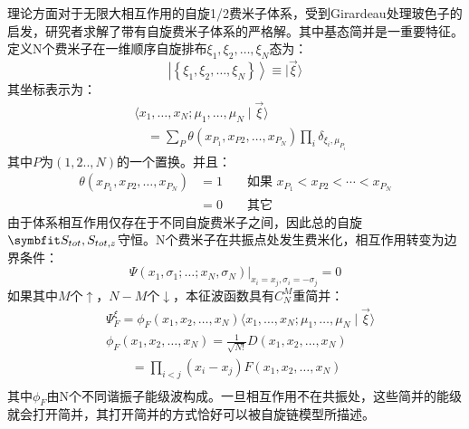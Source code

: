 理论方面对于无限大相互作用的自旋1/2费米子体系，受到Girardeau处理玻色子的启发，研究者求解了带有自旋费米子体系的严格解\cite{Guan2009exact}。其中基态简并是一重要特征。定义N个费米子在一维顺序自旋排布$\xi_{1}, \xi_{2}, \ldots, \xi_{N}$态为：
\begin{equation}
\left|\left\{\xi_{1}, \xi_{2}, \ldots, \xi_{N}\right\}\right\rangle \equiv|\vec{\xi}\rangle
\end{equation}
其坐标表示为：
\begin{equation}
\begin{aligned}
&\langle x_{1}, \ldots, x_{N} ; \mu_{1}, \ldots, \mu_{N} \mid \vec{\xi}\rangle \\
&\quad=\sum_{P} \theta\left(x_{P_{1}}, x_{P 2}, \ldots, x_{P_{N}}\right) \prod_{i} \delta_{\xi_{i}, \mu_{P_{i}}}
\end{aligned}
\end{equation}
其中$P$为$(1,2..,N)$的一个置换。并且：
\begin{equation}
\begin{aligned}
\theta\left(x_{P_{1}}, x_{P 2}, \ldots, x_{P_{N}}\right) &=1 & & \text { 如果 } x_{P_{1}}<x_{P 2}<\cdots<x_{P_{N}} \\
&=0 & & \text { 其它 }
\end{aligned}
\end{equation}
由于体系相互作用仅存在于不同自旋费米子之间，因此总的自旋$\Vector{S}_{tot},S_{tot,z}$守恒。N个费米子在共振点处发生费米化，相互作用转变为边界条件：
\begin{equation}
\left.\Psi\left(x_{1}, \sigma_{1} ; \ldots ; x_{N}, \sigma_{N}\right)\right|_{x_{i}=x_{j}, \sigma_{i}=-\sigma_{j}}=0
\end{equation}
如果其中$M$个$\uparrow$，$N-M$个$\downarrow$，本征波函数具有$C_N^M$重简并：
\begin{equation}
\begin{split}
&\Psi_{F}^{\xi}=\phi_{F}\left(x_{1}, x_{2}, \ldots, x_{N}\right)\langle x_{1}, \ldots, x_{N} ; \mu_{1}, \ldots, \mu_{N} \mid \vec{\xi}\rangle\\
&\phi_{F}\left(x_{1}, x_{2}, \ldots, x_{N}\right) =\frac{1}{\sqrt{N !}} D\left(x_{1}, x_{2}, \ldots, x_{N}\right) \\
&\quad\quad =\prod_{i<j}\left(x_{i}-x_{j}\right) F\left(x_{1}, x_{2}, \ldots, x_{N}\right)\\
\end{split}
\end{equation}
其中$\phi_F$由N个不同谐振子能级波构成。一旦相互作用不在共振处，这些简并的能级就会打开简并，其打开简并的方式恰好可以被自旋链模型所描述。
